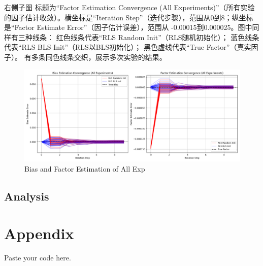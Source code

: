 \documentclass[openany,12pt,UTF8]{ctexart}
\begin{document}
右侧子图
标题为“Factor Estimation Convergence (All Experiments)”（所有实验的因子估计收敛）。横坐标是“Iteration Step”（迭代步骤），范围从0到8；纵坐标是“Factor Estimate Error”（因子估计误差），范围从 -0.00015到0.000025。图中同样有三种线条：
红色线条代表“RLS Random Init”（RLS随机初始化）；
 蓝色线条代表“RLS BLS Init”（RLS以BLS初始化）；
 黑色虚线代表“True Factor”（真实因子）。
有多条同色线条交织，展示多次实验的结果。 
\begin{figure}[h]\centering
    \includegraphics[width=\columnwidth]{figures/Bias and Factor Estimation of All Exp.png}
    \caption{Bias and Factor Estimation of All Exp}
    \label{figure:Bias and Factor Estimation of All Exp}
\end{figure}

\subsection{Analysis}

\section{Appendix}
Paste your code here.
\end{document}
